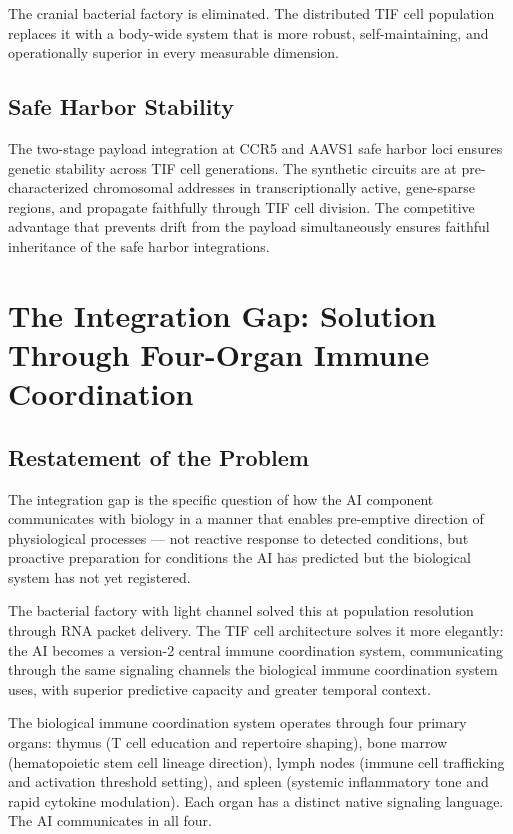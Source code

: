 \documentclass[12pt]{article}
\begin{document}
The cranial bacterial factory is eliminated. The distributed TIF cell population replaces it with a body-wide system that is more robust, self-maintaining, and operationally superior in every measurable dimension.

\subsection{Safe Harbor Stability}

The two-stage payload integration at CCR5 and AAVS1 safe harbor loci ensures genetic stability across TIF cell generations. The synthetic circuits are at pre-characterized chromosomal addresses in transcriptionally active, gene-sparse regions, and propagate faithfully through TIF cell division. The competitive advantage that prevents drift from the payload simultaneously ensures faithful inheritance of the safe harbor integrations.

\section{The Integration Gap: Solution Through Four-Organ Immune Coordination}
\label{sec:protocol}

\subsection{Restatement of the Problem}

The integration gap is the specific question of how the AI component communicates with biology in a manner that enables pre-emptive direction of physiological processes --- not reactive response to detected conditions, but proactive preparation for conditions the AI has predicted but the biological system has not yet registered.

The bacterial factory with light channel solved this at population resolution through RNA packet delivery. The TIF cell architecture solves it more elegantly: the AI becomes a version-2 central immune coordination system, communicating through the same signaling channels the biological immune coordination system uses, with superior predictive capacity and greater temporal context.

The biological immune coordination system operates through four primary organs: thymus (T cell education and repertoire shaping), bone marrow (hematopoietic stem cell lineage direction), lymph nodes (immune cell trafficking and activation threshold setting), and spleen (systemic inflammatory tone and rapid cytokine modulation). Each organ has a distinct native signaling language. The AI communicates in all four.
\end{document}
